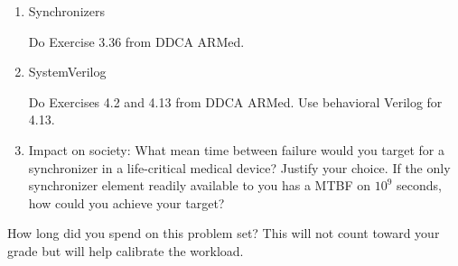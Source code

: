 \documentclass{ps}
\begin{document}
\begin{enumerate}
\begin{center}
  \end{center}
  \begin{solution}
  \end{solution}

\item Synchronizers

  Do Exercise 3.36 from DDCA ARMed.
  \begin{solution}
  \end{solution}

\item SystemVerilog

  Do Exercises 4.2 and 4.13 from DDCA ARMed.  Use behavioral Verilog
  for 4.13.
  \begin{solution}
  \end{solution}

\item Impact on society: What mean time between failure would you
  target for a synchronizer in a life-critical medical device?
  Justify your choice.  If the only synchronizer element readily
  available to you has a MTBF on \(10^9\) seconds, how could you
  achieve your target?
  \begin{solution}
  \end{solution}
\end{enumerate}

How long did you spend on this problem set?  This will not count
toward your grade but will help calibrate the workload.
\begin{solution}
\end{solution}
\end{document}

